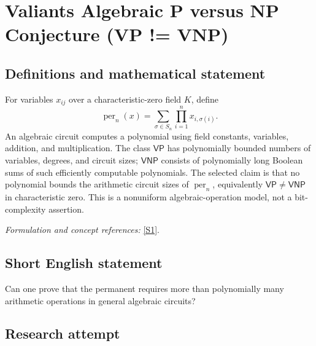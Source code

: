 \documentclass[11pt,a4paper]{article}
\newcommand{\sref}[2]{\hyperlink{source:#1:#2}{[S#2]}}
\newif\ifshowcatalogue
\newcommand{\cataloguescope}[1]{\ifshowcatalogue
 \paragraph{Exact scope in the supplied catalogue.}
 \begin{quote}\small #1\end{quote}\fi}
\numberwithin{equation}{section}
\begin{document}
\setcounter{section}{31}
\clearpage
\section{\texorpdfstring{Valiants Algebraic P versus NP Conjecture (VP != VNP)}{Valiants Algebraic P versus NP Conjecture (VP != VNP)}}\label{32}
\subsection{Definitions and mathematical statement}
For variables $x_{ij}$ over a characteristic-zero field $K$, define
\[
 \operatorname{per}_n(x)=\sum_{\sigma\in S_n}\prod_{i=1}^n x_{i,\sigma(i)}.
\]
An algebraic circuit computes a polynomial using field constants, variables, addition, and multiplication. The class $\mathsf{VP}$ has polynomially bounded numbers of variables, degrees, and circuit sizes; $\mathsf{VNP}$ consists of polynomially long Boolean sums of such efficiently computable polynomials. The selected claim is that no polynomial bounds the arithmetic circuit sizes of $\operatorname{per}_n$, equivalently $\mathsf{VP}\ne\mathsf{VNP}$ in characteristic zero. This is a nonuniform algebraic-operation model, not a bit-complexity assertion.
\par\smallskip\textit{Formulation and concept references:} \sref{32}{1}.
\cataloguescope{Prove that the permanent polynomial family cannot be computed by polynomial-size algebraic circuits over fields of characteristic zero, equivalently that VP is not equal to VNP.}
\subsection{Short English statement}
Can one prove that the permanent requires more than polynomially many arithmetic operations in general algebraic circuits?
\subsection{Research attempt}
\end{document}
